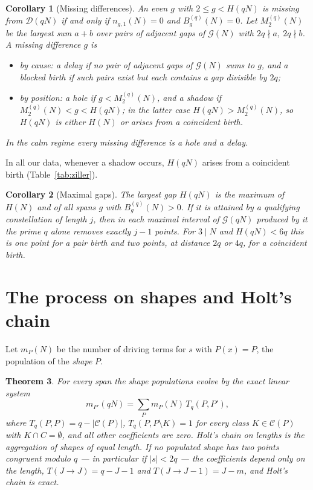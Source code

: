 \documentclass[11pt]{article}
\newtheorem{theorem}{Theorem}[section]
\newtheorem{corollary}[theorem]{Corollary}
\theoremstyle{definition}
\theoremstyle{remark}
\newcommand{\G}{\mathcal{G}}
\newcommand{\D}{\mathcal{D}}
\newcommand{\C}{\mathcal{C}}
\begin{document}
\begin{corollary}[Missing differences]\label{cor:missing}
An even $g$ with $2 \le g < H(qN)$ is missing from $\D(qN)$ if and only if $n_{g,1}(N) = 0$ and $B^{(q)}_g(N) = 0$. Let $M^{(q)}_2(N)$ be the largest sum $a + b$ over pairs of adjacent gaps of $\G(N)$ with $2q \nmid a$, $2q \nmid b$. A missing difference $g$ is
\begin{itemize}
\item by cause: a \emph{delay} if no pair of adjacent gaps of $\G(N)$ sums to $g$, and a \emph{blocked birth} if such pairs exist but each contains a gap divisible by $2q$;
\item by position: a \emph{hole} if $g < M^{(q)}_2(N)$, and a \emph{shadow} if $M^{(q)}_2(N) < g < H(qN)$; in the latter case $H(qN) > M^{(q)}_2(N)$, so $H(qN)$ is either $H(N)$ or arises from a coincident birth.
\end{itemize}
In the calm regime every missing difference is a hole and a delay.
\end{corollary}
In all our data, whenever a shadow occurs, $H(qN)$ arises from a coincident birth (Table~\ref{tab:ziller}).

\begin{corollary}[Maximal gaps]\label{cor:max}
The largest gap $H(qN)$ is the maximum of $H(N)$ and of all spans $g$ with $B^{(q)}_g(N) > 0$. If it is attained by a qualifying constellation of length $j$, then in each maximal interval of $\G(qN)$ produced by it the prime $q$ alone removes exactly $j - 1$ points. For $3 \mid N$ and $H(qN) < 6q$ this is one point for a pair birth and two points, at distance $2q$ or $4q$, for a coincident birth.
\end{corollary}

\section{The process on shapes and Holt's chain}\label{sec:chain}

Let $m_P(N)$ be the number of driving terms for $s$ with $P(x) = P$, the population of the \emph{shape} $P$.

\begin{theorem}\label{thm:chain}
For every span the shape populations evolve by the exact linear system
\[
  m_{P'}(qN) = \sum_P m_P(N)\, T_q(P, P'),
\]
where $T_q(P, P) = q - |\C(P)|$, $T_q(P, P \setminus K) = 1$ for every class $K \in \C(P)$ with $K \cap C = \emptyset$, and all other coefficients are zero. Holt's chain on lengths is the aggregation of shapes of equal length. If no populated shape has two points congruent modulo $q$ --- in particular if $|s| < 2q$ --- the coefficients depend only on the length, $T(J \to J) = q - J - 1$ and $T(J \to J - 1) = J - m$, and Holt's chain is exact.
\end{theorem}
\end{document}
